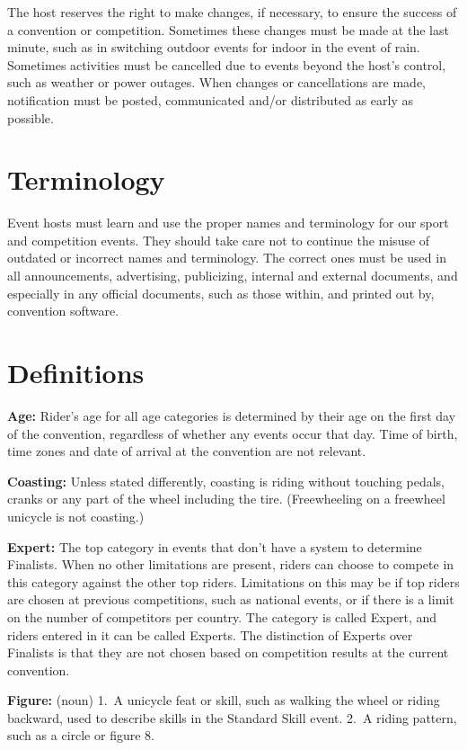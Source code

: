 The host reserves the right to make changes, if necessary, to ensure the success of a convention or competition.
Sometimes these changes must be made at the last minute, such as in switching outdoor events for indoor in the event of rain.
Sometimes activities must be cancelled due to events beyond the host's control, such as weather or power outages.
When changes or cancellations are made, notification must be posted, communicated and/or distributed as early as possible.

\section{Terminology}
Event hosts must learn and use the proper names and terminology for our sport and competition events.
They should take care not to continue the misuse of outdated or incorrect names and terminology.
The correct ones must be used in all announcements, advertising, publicizing, internal and external documents, and especially in any official documents, such as those within, and printed out by, convention software.

\section{Definitions \label{chap:general_definitions}}

\textbf{Age:} Rider's age for all age categories is determined by their age on the first day of the convention, regardless of whether any events occur that day.
Time of birth, time zones and date of arrival at the convention are not relevant.

\textbf{Coasting:} Unless stated differently, coasting is riding without touching pedals, cranks or any part of the wheel including the tire.
(Freewheeling on a freewheel unicycle is not coasting.)

\textbf{Expert:} The top category in events that don't have a system to determine Finalists.
When no other limitations are present, riders can choose to compete in this category against the other top riders.
Limitations on this may be if top riders are chosen at previous competitions, such as national events, or if there is a limit on the number of competitors per country.
The category is called Expert, and riders entered in it can be called Experts.
The distinction of Experts over Finalists is that they are not chosen based on competition results at the current convention.

\textbf{Figure:} (noun) 1.~A unicycle feat or skill, such as walking the wheel or riding backward, used to describe skills in the Standard Skill event.
2.~A riding pattern, such as a circle or figure 8.

